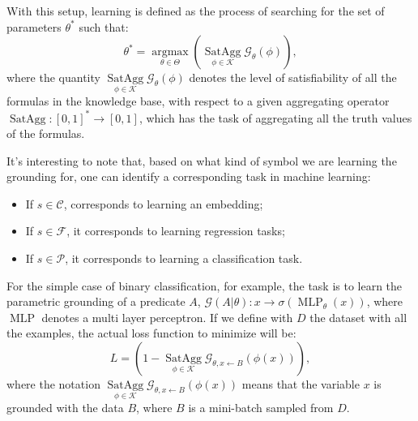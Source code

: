  \textcolor{unipd}{With this setup, learning is defined as the process of searching for the set of parameters $\theta^*$ such that:
 	\begin{equation*}
 	\theta^{*}=\underset{\theta \in \Theta}{\operatorname{argmax}} \left(\underset{\phi \in \mathcal{K}} {\operatorname{SatAgg}} \mathcal{G}_{\theta}(\phi)\right),
 	\end{equation*} 
 where the quantity $\underset{\phi \in \mathcal{K}} {\operatorname{SatAgg}} \mathcal{G}_{\theta}(\phi)$ denotes the level of satisfiability of all the formulas in the knowledge base, with respect to a given aggregating operator $\operatorname{SatAgg}:\left[0,1\right]^* \rightarrow \left[0,1\right]$, which has the task of aggregating all the truth values of the formulas.
}
 
 It's interesting to note that, based on what kind of symbol we are learning the grounding for, one can identify a corresponding task in machine learning:
 \begin{itemize}
 	\item If $s \in \mathcal{C}$, corresponds to learning an embedding;
 	\item If $s \in \mathcal{F}$, it corresponds to learning regression tasks;
 	\item If $s \in \mathcal{P}$, it corresponds to learning a classification task.
 \end{itemize}
\textcolor{unipd}{For the simple case of binary classification, for example, the task is to learn the parametric grounding of a predicate $A$, $\mathcal{G}(A|\theta):x \rightarrow \sigma(\operatorname{MLP}_{\theta}(x))$, where $\operatorname{MLP}$ denotes a multi layer perceptron. If we define with $D$ the dataset with all the examples, the actual loss function to minimize will be:
	\begin{equation*}
	L = \left(1 - \underset{\phi \in \mathcal{K}} {\operatorname{SatAgg}} \mathcal{G}_{\theta,x\leftarrow B}(\phi(x)) \right),
	\end{equation*}
	where the notation $\underset{\phi \in \mathcal{K}} {\operatorname{SatAgg}} \mathcal{G}_{\theta,x\leftarrow B}(\phi(x))$ means that the variable $x$ is grounded with the data $B$, where $B$ is a mini-batch sampled from $D$.}

 
